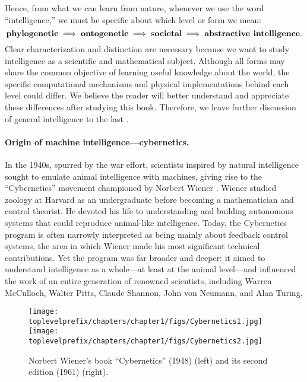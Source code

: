 \documentclass[../../book-main.tex]{subfiles}
\begin{document}
Hence, from what we can learn from nature, whenever we use the word ``intelligence,'' we must be specific about which level or form we mean:
\begin{equation}
    \text{\textbf{phylogenetic}} \;
   \Longrightarrow \; \text{\textbf{ontogenetic}} \; \Longrightarrow \; 
   \text{\textbf{societal}}
   \; \Longrightarrow \; 
   \text{\textbf{abstractive intelligence}}.
\end{equation}
Clear characterization and distinction are necessary because we want to study intelligence as a scientific and mathematical subject. Although all forms may share the common objective of learning useful knowledge about the world, the specific computational mechanisms and physical implementations behind each level could differ. We believe the reader will better understand and appreciate these differences after studying this book. Therefore, we leave further discussion of general intelligence to the last .

\paragraph{Origin of machine intelligence---cybernetics.}
In the 1940s, spurred by the war effort, scientists inspired by natural intelligence sought to emulate animal intelligence with machines, giving rise to the ``Cybernetics'' movement championed by Norbert Wiener \cite{Kline-2011}. Wiener studied zoology at Harvard as an undergraduate before becoming a mathematician and control theorist. He devoted his life to understanding and building autonomous systems that could reproduce animal-like intelligence. Today, the Cybernetics program is often narrowly interpreted as being mainly about feedback control systems, the area in which Wiener made his most significant technical contributions. Yet the program was far broader and deeper: it aimed to understand intelligence as a whole---at least at the animal level---and influenced the work of an entire generation of renowned scientists, including Warren McCulloch, Walter Pitts, Claude Shannon, John von Neumann, and Alan Turing.

\begin{figure}
    \centering
    \texttt{[image: \\toplevelprefix/chapters/chapter1/figs/Cybernetics1.jpg]}
    \hspace{10mm} \texttt{[image: \\toplevelprefix/chapters/chapter1/figs/Cybernetics2.jpg]}
    \caption{Norbert Wiener's book ``Cybernetics'' (1948) \cite{Wiener-Cybernetics-1948} (left) and its second edition (1961) \cite{Wiener-Cybernetics-1961} (right).}
    \label{fig:cybernetcis}
\end{figure}
\end{document}
